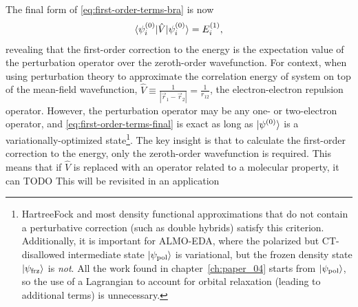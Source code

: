 \documentclass[%
class = book,%
crop = false,%
float = true,%
multi = true,%
preview = false,%
]{standalone}
\newcommand\hf{Hartree\textendash{}Fock\xspace}%
\begin{document}
The final form of \eqref{eq:first-order-terms-bra} is now
\begin{equation}
  \label{eq:first-order-terms-final}
  \braket{\psi_{i}^{(0)} | \hat{V} | \psi_{i}^{(0)}} = E_{i}^{(1)},
\end{equation}
revealing that the first-order correction to the energy is the expectation value of the perturbation operator over the zeroth-order wavefunction. For context, when using perturbation theory to approximate the correlation energy of system on top of the mean-field wavefunction, \(\hat{V} \equiv \frac{1}{|\vec{r}_{1} - \vec{r}_{2}|} = \frac{1}{r_{12}}\), the electron-electron repulsion operator. However, the perturbation operator may be any one- or two-electron operator, and \eqref{eq:first-order-terms-final} is exact as long as \(\ket{\psi^{(0)}}\) is a variationally-optimized state\footnote{\hf and most density functional approximations that do not contain a perturbative correction (such as double hybrids) satisfy this criterion. Additionally, it is important for ALMO-EDA, where the polarized but CT-disallowed intermediate state \(\ket{\psi_{\text{pol}}}\) is variational, but the frozen density state \(\ket{\psi_{\text{frz}}}\) is \emph{not}. All the work found in chapter~\ref{ch:paper_04} starts from \(\ket{\psi_{\text{pol}}}\), so the use of a Lagrangian to account for orbital relaxation (leading to additional terms) is unnecessary.}. The key insight is that to calculate the first-order correction to the energy, only the zeroth-order wavefunction is required. This means that if \(\hat{V}\) is replaced with an operator related to a molecular property, it can TODO This will be revisited in an application
\end{document}
